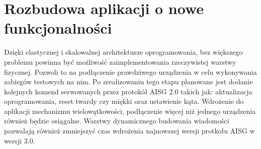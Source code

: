 \section{Rozbudowa aplikacji o nowe funkcjonalności}
    Dzięki elastycznej i skalowalnej architekturze oprogramowania, bez większego problemu powinna być możliwość zaimplementowania rzeczywistej
    warstwy fizycznej. Pozwoli to na podłączenie prawdziwego urządzenia w celu wykonywania zabiegów testowych na nim. Po zrealizowaniu
    tego etapu planowane jest dodanie kolejnych komend serwowanych przez protokół AISG 2.0 takich jak: aktualizacja oprogramowania, 
    reset twardy czy miękki oraz ustawienie kąta. Wdrożenie do aplikacji mechanizmu wielowątkowości, podłączenie więcej niż jednego urządzenia również będzie osiągalne.
    Warstwy dynamicznego budowania wiadomości pozwalają również zmniejszyć czas wdrożenia najnowszej wersji protkołu AISG w wersji 3.0.

